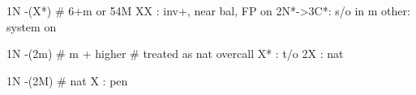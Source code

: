 1N -(X*) # 6+m or 54M
XX : inv+, near bal, FP on
2N*->3C*: s/o in m
other: system on

1N -(2m) # m + higher
# treated as nat overcall
X* : t/o
2X : nat

1N -(2M) # nat
X  : pen